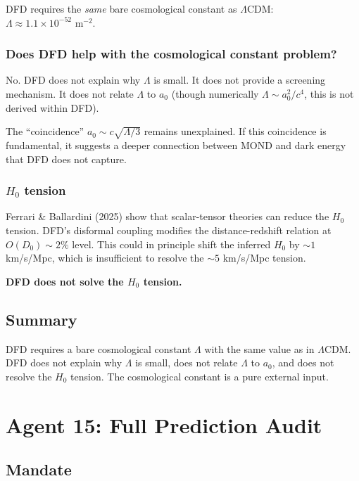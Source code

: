 \documentclass[11pt,a4paper]{article}
\begin{document}
DFD requires the \emph{same} bare cosmological constant as $\Lambda$CDM: $\Lambda \approx 1.1 \times 10^{-52}\text{ m}^{-2}$.

\subsubsection{Does DFD help with the cosmological constant problem?}

No. DFD does not explain why $\Lambda$ is small. It does not provide a screening mechanism. It does not relate $\Lambda$ to $a_0$ (though numerically $\Lambda \sim a_0^2/c^4$, this is not derived within DFD).

The ``coincidence'' $a_0 \sim c\sqrt{\Lambda/3}$ remains unexplained. If this coincidence is fundamental, it suggests a deeper connection between MOND and dark energy that DFD does not capture.

\subsubsection{$H_0$ tension}

Ferrari \& Ballardini (2025) show that scalar-tensor theories can reduce the $H_0$ tension. DFD's disformal coupling modifies the distance-redshift relation at $O(D_0) \sim 2\%$ level. This could in principle shift the inferred $H_0$ by $\sim 1$ km/s/Mpc, which is insufficient to resolve the $\sim 5$ km/s/Mpc tension.

\textbf{DFD does not solve the $H_0$ tension.}

\subsection{Summary}

DFD requires a bare cosmological constant $\Lambda$ with the same value as in $\Lambda$CDM. DFD does not explain why $\Lambda$ is small, does not relate $\Lambda$ to $a_0$, and does not resolve the $H_0$ tension. The cosmological constant is a pure external input.


\newpage
\section{Agent 15: Full Prediction Audit}
\label{sec:agent15}

\subsection{Mandate}
\end{document}
